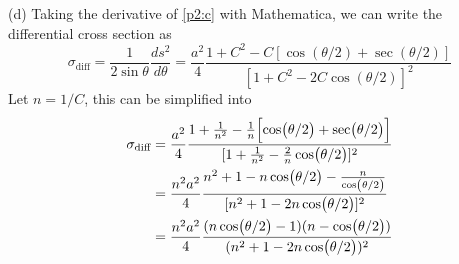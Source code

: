 \documentclass[12pt]{article}
\begin{document}
\begin{problem}{2}
\begin{solution}
(d) Taking the derivative of \eqref{p2:c} with Mathematica, we can write the
differential cross section as
\begin{equation}
    \sigma_{\text{diff}}
    =\frac1{2\sin\theta}\frac{ds^2}{d\theta}
    =\frac{a^2}{4}\frac{1+C^2-C[\cos(\theta/2)+\sec(\theta/2)]}{[1+C^2-2C\cos(\theta/2)]^2}
\end{equation}
Let $n=1 /C$, this can be simplified into
\begin{align}
    \sigma_{\text{diff}}
    &=\frac{a^2}{4}\frac{1+\frac1{n^2}-\frac1n\qty[\cos(\theta/2)+\sec(\theta/2)]}{[1+\frac1{n^2}-\frac2n\cos(\theta/2)]^2}\notag\\
    &=\frac{n^2a^2}{4}\frac{n^2+1-n\cos(\theta/2)-\frac{n}{\cos(\theta/2)}}{[n^2+1-2n\cos(\theta/2)]^2}\notag\\
    &=\frac{n^2a^2}{4}\frac{(n\cos(\theta/2)-1)(n-\cos(\theta/2))}{(n^2+1-2n\cos(\theta/2))^2}
\end{align}
\end{solution}
\end{problem}
\end{document}
